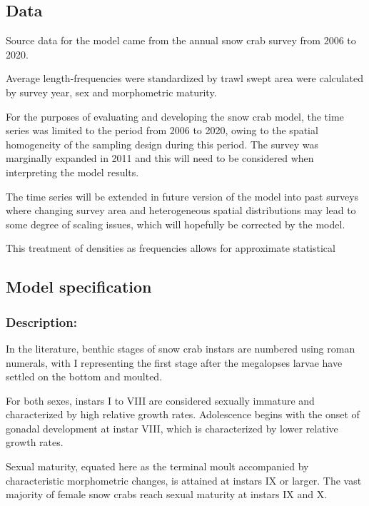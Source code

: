 \documentclass[
]{article}
\begin{document}
\hypertarget{data}{%
\subsection{Data}\label{data}}

Source data for the model came from the annual snow crab survey from
2006 to 2020.

Average length-frequencies were standardized by trawl swept area were
calculated by survey year, sex and morphometric maturity.

For the purposes of evaluating and developing the snow crab model, the
time series was limited to the period from 2006 to 2020, owing to the
spatial homogeneity of the sampling design during this period. The
survey was marginally expanded in 2011 and this will need to be
considered when interpreting the model results.

The time series will be extended in future version of the model into
past surveys where changing survey area and heterogeneous spatial
distributions may lead to some degree of scaling issues, which will
hopefully be corrected by the model.

This treatment of densities as frequencies allows for approximate
statistical

\hypertarget{model-specification}{%
\subsection{Model specification}\label{model-specification}}

\hypertarget{description}{%
\subsubsection{Description:}\label{description}}

In the literature, benthic stages of snow crab instars are numbered
using roman numerals, with I representing the first stage after the
megalopses larvae have settled on the bottom and moulted.

For both sexes, instars I to VIII are considered sexually immature and
characterized by high relative growth rates. Adolescence begins with the
onset of gonadal development at instar VIII, which is characterized by
lower relative growth rates.

Sexual maturity, equated here as the terminal moult accompanied by
characteristic morphometric changes, is attained at instars IX or
larger. The vast majority of female snow crabs reach sexual maturity at
instars IX and X.
\end{document}
